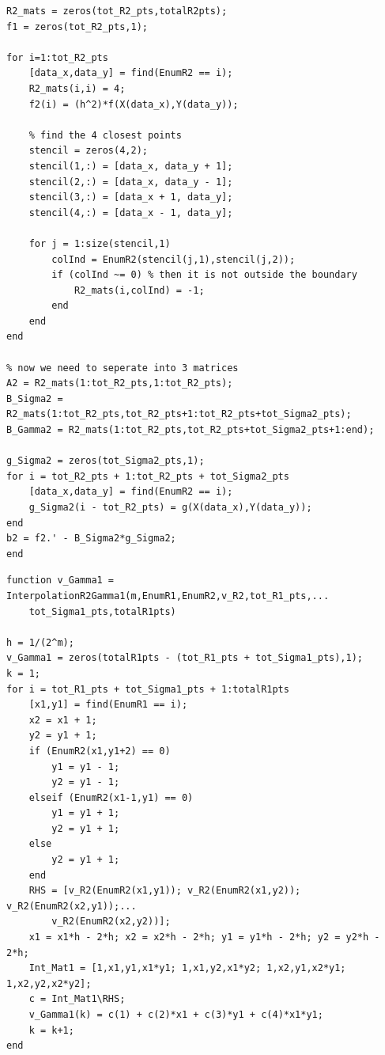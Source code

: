 \documentclass[12pt]{article}
\begin{document}
\begin{lstlisting}[caption=Generate Matrices and Vectors]
% generate matrices corresponding to R2
R2_mats = zeros(tot_R2_pts,totalR2pts);
f1 = zeros(tot_R2_pts,1);

for i=1:tot_R2_pts 
    [data_x,data_y] = find(EnumR2 == i);
    R2_mats(i,i) = 4;
    f2(i) = (h^2)*f(X(data_x),Y(data_y));
    
    % find the 4 closest points
    stencil = zeros(4,2);
    stencil(1,:) = [data_x, data_y + 1];
    stencil(2,:) = [data_x, data_y - 1];
    stencil(3,:) = [data_x + 1, data_y];
    stencil(4,:) = [data_x - 1, data_y];
    
    for j = 1:size(stencil,1)
        colInd = EnumR2(stencil(j,1),stencil(j,2));
        if (colInd ~= 0) % then it is not outside the boundary
            R2_mats(i,colInd) = -1;
        end
    end
end

% now we need to seperate into 3 matrices
A2 = R2_mats(1:tot_R2_pts,1:tot_R2_pts);
B_Sigma2 = R2_mats(1:tot_R2_pts,tot_R2_pts+1:tot_R2_pts+tot_Sigma2_pts);
B_Gamma2 = R2_mats(1:tot_R2_pts,tot_R2_pts+tot_Sigma2_pts+1:end);

g_Sigma2 = zeros(tot_Sigma2_pts,1);
for i = tot_R2_pts + 1:tot_R2_pts + tot_Sigma2_pts
    [data_x,data_y] = find(EnumR2 == i);
    g_Sigma2(i - tot_R2_pts) = g(X(data_x),Y(data_y));
end
b2 = f2.' - B_Sigma2*g_Sigma2;
end
\end{lstlisting}

\lstset{language=matlab,frame=single}
\begin{lstlisting}[caption=Interpolation Operator on $R_2$ for $\Gamma_1$]
function v_Gamma1 = InterpolationR2Gamma1(m,EnumR1,EnumR2,v_R2,tot_R1_pts,...
    tot_Sigma1_pts,totalR1pts)

h = 1/(2^m);
v_Gamma1 = zeros(totalR1pts - (tot_R1_pts + tot_Sigma1_pts),1);
k = 1;
for i = tot_R1_pts + tot_Sigma1_pts + 1:totalR1pts
    [x1,y1] = find(EnumR1 == i);
    x2 = x1 + 1;
    y2 = y1 + 1;
    if (EnumR2(x1,y1+2) == 0)
        y1 = y1 - 1;
        y2 = y1 - 1;
    elseif (EnumR2(x1-1,y1) == 0)
        y1 = y1 + 1;
        y2 = y1 + 1;
    else
        y2 = y1 + 1;
    end
    RHS = [v_R2(EnumR2(x1,y1)); v_R2(EnumR2(x1,y2)); v_R2(EnumR2(x2,y1));...
        v_R2(EnumR2(x2,y2))];
    x1 = x1*h - 2*h; x2 = x2*h - 2*h; y1 = y1*h - 2*h; y2 = y2*h - 2*h; 
    Int_Mat1 = [1,x1,y1,x1*y1; 1,x1,y2,x1*y2; 1,x2,y1,x2*y1; 1,x2,y2,x2*y2];
    c = Int_Mat1\RHS;
    v_Gamma1(k) = c(1) + c(2)*x1 + c(3)*y1 + c(4)*x1*y1;
    k = k+1;
end
\end{lstlisting}
\end{document}
